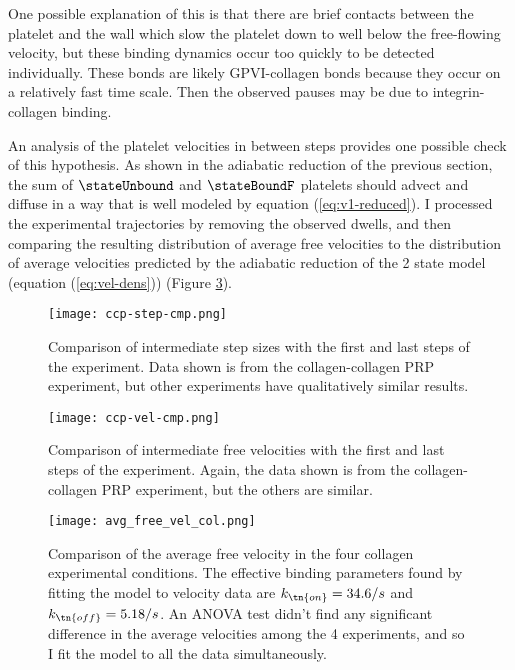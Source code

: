 One possible explanation of this is that there are brief contacts
between the platelet and the wall which slow the platelet down to well
below the free-flowing velocity, but these binding dynamics occur too
quickly to be detected individually. These bonds are likely
GPVI-collagen bonds because they occur on a relatively fast time
scale. Then the observed pauses may be due to integrin-collagen binding.

An analysis of the platelet velocities in between steps provides one
possible check of this hypothesis. As shown in the adiabatic reduction
of the previous section, the sum of $\stateUnbound$ and $\stateBoundF$
platelets should advect and diffuse in a way that is well modeled by
equation (\ref{eq:v1-reduced}). I processed the experimental
trajectories by removing the observed dwells, and then comparing the
resulting distribution of average free velocities to the distribution of
average velocities predicted by the adiabatic reduction of the 2 state
model (equation (\ref{eq:vel-dens})) (Figure \ref{fig:avg-free-vel-col}).

\begin{figure}
  \centering
  \texttt{[image: ccp-step-cmp.png]}
  \caption{Comparison of intermediate step sizes with the first and
    last steps of the experiment. Data shown is from the
    collagen-collagen PRP experiment, but other experiments have
    qualitatively similar results.}
  \label{fig:ccp-step-cmp}
\end{figure}

\begin{figure}
  \centering
  \texttt{[image: ccp-vel-cmp.png]}
  \caption{Comparison of intermediate free velocities with the first
    and last steps of the experiment. Again, the data shown is from
    the collagen-collagen PRP experiment, but the others are similar.}
  \label{fig:ccp-vel-cmp}
\end{figure}

\begin{figure}
  \centering
  \texttt{[image: avg\_free\_vel\_col.png]}
  \caption{Comparison of the average free velocity in the four collagen
    experimental conditions. The effective binding parameters found by
    fitting the model to velocity data are $k_\tn{on}=34.6/s$ and
    $k_\tn{off} = 5.18/s$. An ANOVA test didn't find any significant
    difference in the average velocities among the 4 experiments, and so
    I fit the model to all the data simultaneously.}
  \label{fig:avg-free-vel-col}
\end{figure}

